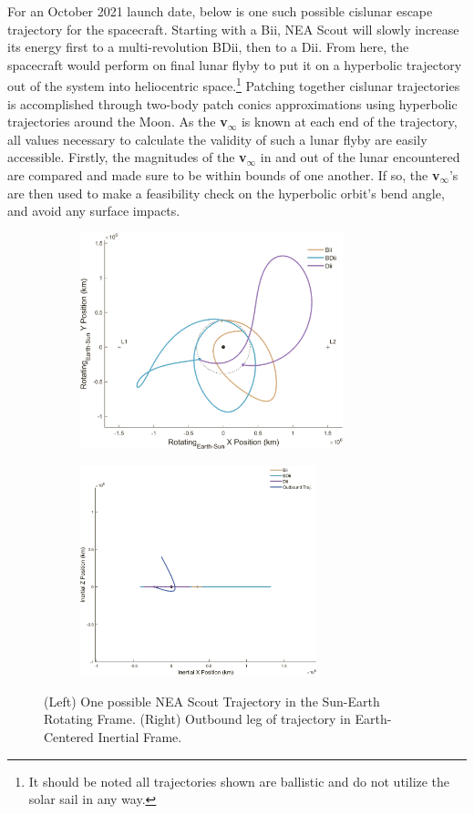\documentclass[letterpaper, paper,11pt]{AAS}	%
\begin{document}
For an October 2021 launch date, below is one such possible cislunar escape trajectory for the spacecraft. Starting with a Bii, NEA Scout will slowly increase its energy first to a multi-revolution BDii, then to a Dii. From here, the spacecraft would perform on final lunar flyby to put it on a hyperbolic trajectory out of the system into heliocentric space.\footnote{It should be noted all trajectories shown are ballistic and do not utilize the solar sail in any way.} Patching together cislunar trajectories is accomplished through two-body patch conics approximations using hyperbolic trajectories around the Moon. As the \textbf{v}\(_\infty\) is known at each end of the trajectory, all values necessary to calculate the validity of such a lunar flyby are easily accessible. Firstly, the magnitudes of the \textbf{v}\(_\infty\) in and out of the lunar encountered are compared and made sure to be within bounds of one another. If so, the \textbf{v}\(_\infty\)'s are then used to make a feasibility check on the hyperbolic orbit's bend angle, and avoid any surface impacts. 

\begin{figure}[h]
    \centering
    \begin{subfigure}
        \centering
        \includegraphics[width=3in]{./etc/figure13-2.png}
    \end{subfigure}
    \begin{subfigure}
        \centering
        \includegraphics[width=2.7in]{./etc/figure9-2.png}
    \end{subfigure}
    \caption{(Left) One possible NEA Scout Trajectory in the Sun-Earth Rotating Frame. (Right) Outbound leg of trajectory in Earth-Centered Inertial Frame.}
    \label{fig:neascout}
\end{figure}
\end{document}
